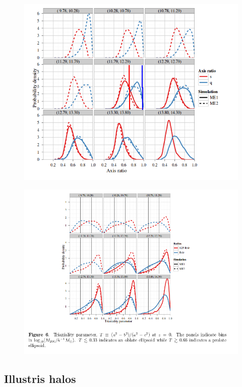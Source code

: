 \begin{figure}[H]
\centering
\includegraphics[scale=0.5]{distribution.png}
\end{figure}

\begin{figure}[H]
\centering
\includegraphics[scale=0.5]{triaxial.png}
\end{figure}


\subsection{Illustris halos}

